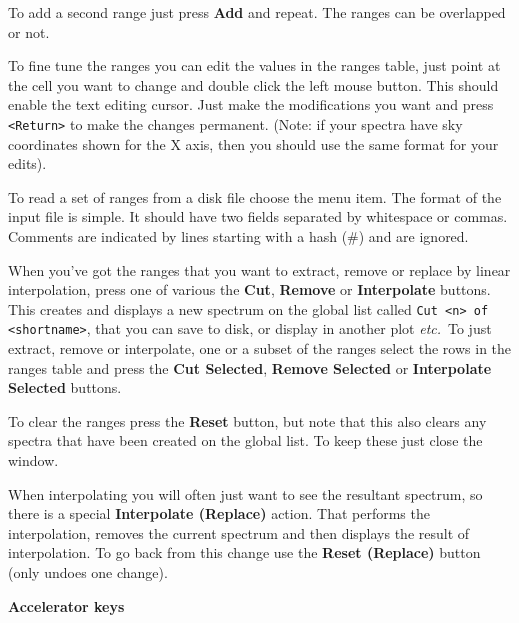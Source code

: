 \documentclass[twoside,11pt,nolof]{starlink}
\newcommand{\submenuitem}[2]{\latexhtml{\textbf{#1$\rightarrow$#2}}{\textbf{#1->#2}}}
\newcommand{\labelitem}[1]{\textbf{#1}}
\providecommand{\hitext}[1]{\texttt{#1}}
\providecommand{\etc}{\textit{etc.}}
\providecommand{\subheading}[1]{\textbf{\large{#1}}}
\begin{document}
To add a second range just press \labelitem{Add} and repeat. The
ranges can be overlapped or not.

To fine tune the ranges you can edit the values in the ranges table,
just point at the cell you want to change and double click the left
mouse button. This should enable the text editing cursor. Just make
the modifications you want and press \hitext{<Return>} to make the
changes permanent. (Note: if your spectra have sky coordinates shown
for the X axis, then you should use the same format for your edits).

To read a set of ranges from a disk file choose the
\submenuitem{File}{Read ranges} menu item. The format of the input file
is simple. It should have two fields separated by whitespace or
commas. Comments are indicated by lines starting with a hash (\#)
and are ignored.

When you've got the ranges that you want to extract, remove or replace by
linear interpolation, press one of various the \labelitem{Cut},
\labelitem{Remove} or \labelitem{Interpolate} buttons. This creates and
displays a new spectrum on the global list called \hitext{Cut <n> of
<shortname>}, that you can save to disk, or display in another plot \etc\ To
just extract, remove or interpolate, one or a subset of the ranges select the
rows in the ranges table and press the \labelitem{Cut Selected},
\labelitem{Remove Selected} or \labelitem{Interpolate Selected} buttons.

To clear the ranges press the \labelitem{Reset} button, but note that
this also clears any spectra that have been created on the global
list. To keep these just close the window.

When interpolating you will often just want to see the resultant spectrum,
so there is a special \labelitem{Interpolate (Replace)} action. That performs
the interpolation, removes the current spectrum and then displays the
result of interpolation. To go back from this change use the
\labelitem{Reset (Replace)} button (only undoes one change).

\subheading{Accelerator keys}
\end{document}
